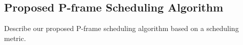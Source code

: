 \subsection{Proposed P-frame Scheduling Algorithm}
\label{sec::PFrameScheduling}
{\color{red}Describe our proposed P-frame scheduling algorithm based on a scheduling metric.}
%
%
%